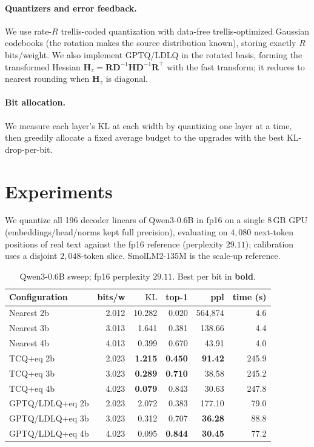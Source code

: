 \documentclass[10pt]{article}
\newcommand{\kl}{\mathrm{KL}}
\begin{document}
\paragraph{Quantizers and error feedback.} We use rate-$R$ trellis-coded
quantization \citep{marcellin1990tcq,tseng2024qtip} with data-free
trellis-optimized Gaussian codebooks (the rotation makes the source distribution
known), storing exactly $R$ bits/weight. We also implement GPTQ/LDLQ
\citep{frantar2023gptq,chee2023quip} in the rotated basis, forming the
transformed Hessian $\mathbf H_z=\mathbf R\mathbf D^{-1}\mathbf H\mathbf D^{-1}\mathbf R^\top$ with
the fast transform; it reduces to nearest rounding when $\mathbf H_z$ is diagonal.

\paragraph{Bit allocation.} We measure each layer's KL at each width by
quantizing one layer at a time, then greedily allocate a fixed average budget to
the upgrades with the best KL-drop-per-bit.

\section{Experiments}
We quantize all 196 decoder linears of Qwen3-0.6B \citep{qwen3_2025} in fp16 on a
single 8\,GB GPU (embeddings/head/norms kept full precision), evaluating on
$4{,}080$ next-token positions of real text against the fp16 reference
(perplexity $29.11$); calibration uses a disjoint $2{,}048$-token slice.
SmolLM2-135M \citep{allal2025smollm2} is the scale-up reference.

\begin{table}[htbp]
\centering
\caption{Qwen3-0.6B sweep; fp16 perplexity $29.11$. Best per bit in \textbf{bold}.}
\label{tab:qwen}
\small
\begin{tabular}{lrrrrr}
\toprule
Configuration & bits/w & $\kl$ & top-1 & ppl & time (s)\\
\midrule
Nearest 2b & 2.012 & 10.282 & 0.020 & 564{,}874 & 4.6\\
Nearest 3b & 3.013 & 1.641 & 0.381 & 138.66 & 4.4\\
Nearest 4b & 4.013 & 0.399 & 0.670 & 43.91 & 4.0\\
\midrule
TCQ+eq 2b & 2.023 & \textbf{1.215} & \textbf{0.450} & \textbf{91.42} & 245.9\\
TCQ+eq 3b & 3.023 & \textbf{0.289} & \textbf{0.710} & 38.58 & 245.2\\
TCQ+eq 4b & 4.023 & \textbf{0.079} & 0.843 & 30.63 & 247.8\\
\midrule
GPTQ/LDLQ+eq 2b & 2.023 & 2.072 & 0.383 & 177.10 & 79.0\\
GPTQ/LDLQ+eq 3b & 3.023 & 0.312 & 0.707 & \textbf{36.28} & 88.8\\
GPTQ/LDLQ+eq 4b & 4.023 & 0.095 & \textbf{0.844} & \textbf{30.45} & 77.2\\
\bottomrule
\end{tabular}
\end{table}
\end{document}
